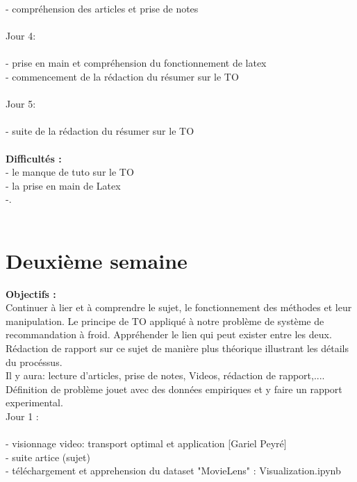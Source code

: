 \documentclass{article}
\begin{document}
        - compréhension des articles et prise de notes\\\\
    Jour 4: \\\\
        - prise en main et compréhension du fonctionnement de latex\\
        - commencement de la rédaction du résumer sur le TO\\\\
    Jour 5: \\\\
        - suite de la rédaction du résumer sur le TO\\\\
    \textbf{Difficultés : }\newline\\
    - le manque de tuto sur le TO\\
    - la prise en main de Latex\\
    -.\\\\
    
\section{Deuxième semaine}

    \textbf{Objectifs : }\newline\\
    Continuer à lier et à comprendre le sujet, le fonctionnement des méthodes et leur manipulation. Le principe de TO appliqué à notre problème de système de recommandation à froid.
    Appréhender le lien qui peut exister entre les deux.
    Rédaction de rapport sur ce sujet de manière plus théorique illustrant les détails du procéssus.\\
    Il y aura: lecture d'articles, prise de notes, Videos, rédaction de rapport,....\\
    Définition de problème jouet avec des données empiriques et y faire un rapport experimental.\newline\\
    Jour 1 : \\\\
        - visionnage video: transport optimal et application [Gariel Peyré]\\
        - suite artice (sujet)\\
        - téléchargement et apprehension du dataset "MovieLens" : Visualization.ipynb\\
\end{document}
